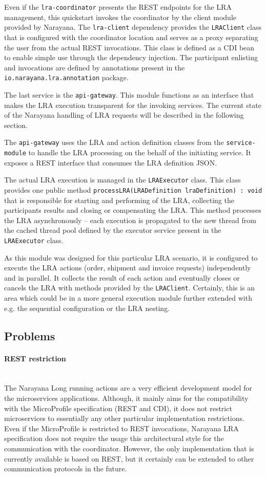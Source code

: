 \documentclass[oneside,
  digital, %
  table,   %
  lof,     %
  lot,     %
]{fithesis3}
\newcommand{\newlinepar}[1]{\paragraph{#1}\needspace{4\baselineskip}\mbox{}\\}
\begin{document}
Even if the \texttt{lra-coordinator} presents the REST endpoints for the LRA management, this quickstart invokes the coordinator by the client module provided by Narayana. The \texttt{lra-client} dependency provides the \texttt{LRAClient} class that is configured with the coordinator location and serves as a proxy separating the user from the actual REST invocations. This class is defined as a CDI bean to enable simple use through the dependency injection. The participant enlisting and invocations are defined by annotations present in the \texttt{io.narayana.lra.annotation} package.

The last service is the \texttt{api-gateway}. This module functions as an interface that makes the LRA execution transparent for the invoking services. The current state of the Narayana handling of LRA requests will be described in the following section.

The \texttt{api-gateway} uses the LRA and action definition classes from the \texttt{service-module} to handle the LRA processing on the behalf of the initiating service. It exposes a REST interface that consumes the LRA definition JSON.

The actual LRA execution is managed in the \texttt{LRAExecutor} class. This class provides one public method \texttt{processLRA(LRADefinition lraDefinition) : void} that is responsible for starting and performing of the LRA, collecting the participants results and closing or compensating the LRA. This method processes the LRA asynchronously -- each execution is propagated to the new thread from the cached thread pool defined by the executor service present in the \texttt{LRAExecutor} class.

As this module was designed for this particular LRA scenario, it is configured to execute the LRA actions (order, shipment and invoice requests) independently and in parallel. It collects the result of each action and eventually closes or cancels the LRA with methods provided by the \texttt{LRAClient}. Certainly, this is an area which could be in a more general execution module further extended with e.g. the sequential configuration or the LRA nesting.

\subsection{Problems}

\newlinepar{REST restriction}

The Narayana Long running actions are a very efficient development model for the microservices applications. Although, it mainly aims for the compatibility with the MicroProfile specification (REST and CDI), it does not restrict microservices to essentially any other particular implementation restrictions. Even if the MicroProfile is restricted to REST invocations, Narayana LRA specification does not require the usage this architectural style for the communication with the coordinator. However, the only implementation that is currently available is based on REST, but it certainly can be extended to other communication protocols in the future.
\end{document}
